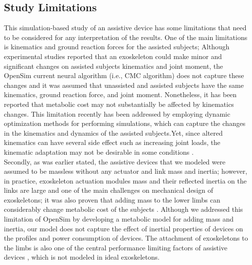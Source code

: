 \documentclass[10pt,letterpaper]{article}
\begin{document}
\subsection*{Study Limitations}
This simulation-based study of an assistive device has some limitations that need to be considered for any interpretation of the results. One of the main limitations is kinematics and ground reaction forces for the assisted subjects; Although experimental studies reported that an exoskeleton could make minor \cite{42,79,91,114,115,116} and significant \cite{80,117,118,119} changes on assisted subjects kinematics and joint moment, the OpenSim current neural algorithm (i.e., CMC algorithm) does not capture these changes and it was assumed that unassisted and assisted subjects have the same kinematics, ground reaction force, and joint moment. Nonetheless, it has been reported that metabolic cost may not substantially be affected by kinematics changes\cite{120}. This limitation recently has been addressed by employing dynamic optimization methods for performing simulations, which can capture the changes in the kinematics and dynamics of the assisted subjects.Yet, since altered kinematics can have several side effect such as increasing joint loads, the kinematic adaptation may not be desirable in some conditions \cite{93}.\\  
Secondly, as was earlier stated, the assistive devices that we modeled were assumed to be massless without any actuator and link mass and inertia; however, in practice, exoskeleton actuation modules mass and their reflected inertia on the links are large and one of the main challenges on mechanical design of exoskeletons; it was also proven that adding mass to the lower limbs can considerably change metabolic cost of the subjects \cite{133}. Although we addressed this limitation of OpenSim by developing a metabolic model for adding mass and inertia, our model does not capture the effect of inertial properties of devices on the profiles and power consumption of devices. The attachment of exoskeletons to the limbs is also one of the central performance limiting factors of assistive devices \cite{121}, which is not modeled in ideal exoskeletons.\\
\end{document}
